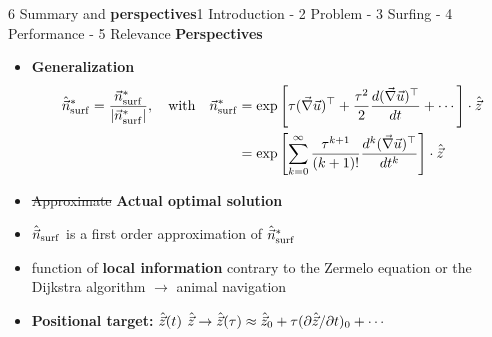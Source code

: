 \begin{frame}{6 Summary and \textbf{perspectives}}{1 Introduction - 2 Problem - 3 Surfing - 4 Performance - 5 Relevance}
	\centering
	\vspace{4pt}
	\textbf{\Large Perspectives}

	\pause
	\vspace{2pt}
	\centering
	\begin{itemize}
		\setlength\itemsep{10pt}
		\item<1-> \textbf{Generalization}
			\begin{align*}
				\hat{\vec{n}}_{\mathrm{surf}}^* = \frac{\vec{n}_{\mathrm{surf}}^*}{\lvert\vec{n}_{\mathrm{surf}}^*\rvert}, \quad \text{with} \quad \vec{n}_{\mathrm{surf}}^* &= \exp \left[ \tau (\vec{\nabla} \vec{u})^\top + \frac{\tau^{2}}{2} \frac{d (\vec{\nabla} \vec{u})^\top}{dt} + \cdots \right] \cdot \hat{\vec{z}} \\
				 &= \exp \left[ \sum_{k=0}^\infty \frac{\tau^{k+1}}{(k+1)!} \frac{d^k (\vec{\nabla} \vec{u})^\top}{dt^k} \right] \cdot \hat{\vec{z}}
			\end{align*}
		\item<1-> \st{Approximate} \textbf{Actual optimal solution}
		\item<1-> $\hat{\vec{n}}_{\mathrm{surf}}$ is a first order approximation of $\hat{\vec{n}}_{\mathrm{surf}}^*$
		\item<1-> function of \textbf{local information} contrary to the Zermelo equation or the Dijkstra algorithm $\to$ animal navigation
		\item<1-> \textbf{Positional target:} $\hat{\vec{z}}(t)$ \quad $\hat{\vec{z}} \to \hat{\vec{z}}(\tau) \approx \hat{\vec{z}}_0 + \tau (\partial \hat{\vec{z}}/ \partial t)_0 + \cdots$
	\end{itemize}
\end{frame}

